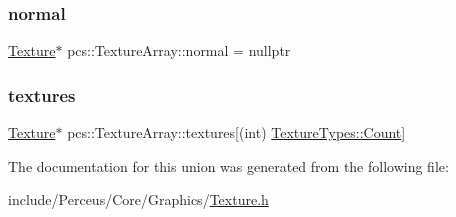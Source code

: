 \mbox{\label{unionpcs_1_1TextureArray_a70257f556ecd88b438daa286d5b2d3ce}} 
\subsubsection{\texorpdfstring{normal}{normal}}
{\footnotesize\ttfamily \hyperlink{classpcs_1_1Texture}{Texture}$\ast$ pcs\+::\+Texture\+Array\+::normal = nullptr}

\mbox{\label{unionpcs_1_1TextureArray_a04e4947ed39b82bc46eb4c5be4a5c361}} 
\subsubsection{\texorpdfstring{textures}{textures}}
{\footnotesize\ttfamily \hyperlink{classpcs_1_1Texture}{Texture}$\ast$ pcs\+::\+Texture\+Array\+::textures\mbox{[}(int) \hyperlink{namespacepcs_a2f6dfe5fadf3611302a9b7259502c3c9ae93f994f01c537c4e2f7d8528c3eb5e9}{Texture\+Types\+::\+Count}\mbox{]}}



The documentation for this union was generated from the following file\+:\begin{DoxyCompactItemize}
\item 
include/\+Perceus/\+Core/\+Graphics/\hyperlink{Texture_8h}{Texture.\+h}\end{DoxyCompactItemize}
